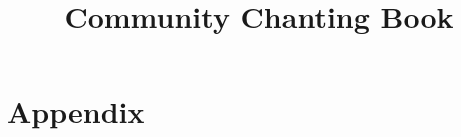 \documentclass[
  babelLanguage=english,
  final,
]{chantingbook}
\title{Community Chanting Book}
\begin{document}


\frontmatter

\cleartoverso


\cleartorecto
\tableofcontents*

\mainmatter



%

\part{Appendix}

\readingsize





\cleartorecto

\end{document}
